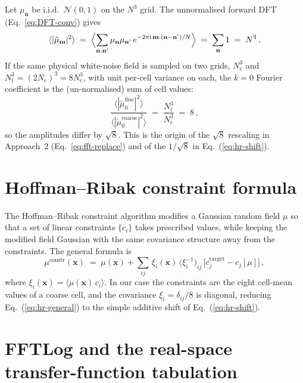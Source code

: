 \documentclass[12pt]{article}
\newcommand{\bx}{\mathbf{x}}
\newcommand{\bn}{\mathbf{n}}
\newcommand{\bm}{\mathbf{m}}
\begin{document}
Let $\mu_\bn$ be i.i.d.\ $\mathcal{N}(0, 1)$ on the $N^3$ grid.  The
unnormalised forward DFT (Eq.~\ref{eq:DFT-conv}) gives
\begin{equation}
  \langle |\tilde\mu_\bm|^2 \rangle
  \;=\;\Bigl\langle \sum_{\bn, \bn'} \mu_\bn \mu_{\bn'}\,
              e^{-2\pi\mathrm{i}\,\bm\cdot(\bn - \bn')/N}\Bigr\rangle
  \;=\;\sum_\bn 1
  \;=\; N^3\,.
  \label{eq:dft-var-derivation}
\end{equation}
If the same physical white-noise field is sampled on two grids,
$N_\mathrm{c}^3$ and $N_\mathrm{f}^3 = (2 N_\mathrm{c})^3 =
8 N_\mathrm{c}^3$, with unit per-cell variance on each, the
$k = 0$ Fourier coefficient is the (un-normalised) sum of cell
values:
\begin{equation}
  \frac{\langle |\tilde\mu^\mathrm{fine}_0|^2 \rangle}
       {\langle |\tilde\mu^\mathrm{coarse}_0|^2 \rangle}
  \;=\;\frac{N_\mathrm{f}^3}{N_\mathrm{c}^3} \;=\; 8\,,
  \label{eq:dft-variance-ratio}
\end{equation}
so the amplitudes differ by $\sqrt{8}$.  This is the origin of the
$\sqrt{8}$ rescaling in Approach~2
(Eq.~\ref{eq:fft-replace}) and of the $1/\sqrt{8}$ in
Eq.~(\ref{eq:hr-shift}).

\section{Hoffman--Ribak constraint formula}
\label{app:hr}

The Hoffman--Ribak constraint algorithm \citep{HoffmanRibak1991}
modifies a Gaussian random field $\mu$ so that a set of linear
constraints $\{c_i\}$ takes prescribed values, while keeping the
modified field Gaussian with the same covariance structure away
from the constraints.  The general formula is
\begin{equation}
  \mu^\mathrm{constr}(\bx)
  \;=\;\mu(\bx) + \sum_{ij}\,
        \xi_i(\bx)\,\bigl(\xi_i^{-1}\bigr)_{ij}\,
        \bigl[c_j^\mathrm{target} - c_j[\mu]\bigr]\,,
  \label{eq:hr-general}
\end{equation}
where $\xi_i(\bx) = \langle \mu(\bx)\,c_i \rangle$.  In our case the
constraints are the eight cell-mean values of a coarse cell, and
the covariance $\xi_i = \delta_{ij}/8$ is diagonal, reducing
Eq.~(\ref{eq:hr-general}) to the simple additive shift of
Eq.~(\ref{eq:hr-shift}).

\section{FFTLog and the real-space transfer-function tabulation}
\label{app:fftlog}
\end{document}
